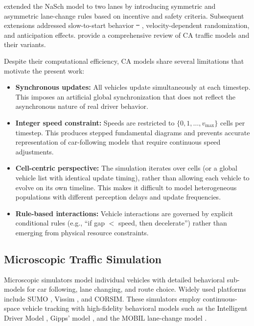 \documentclass[review,authoryear]{elsarticle}
\providecommand{\DIFaddtex}[1]{{\protect\color{blue}\uwave{#1}}} %
\providecommand{\DIFdeltex}[1]{{\protect\color{red}\sout{#1}}}                      %
\providecommand{\DIFaddbegin}{} %
\providecommand{\DIFaddend}{} %
\providecommand{\DIFdelbegin}{} %
\providecommand{\DIFdelend}{} %
\providecommand{\DIFadd}[1]{\texorpdfstring{\DIFaddtex{#1}}{#1}} %
\providecommand{\DIFdel}[1]{\texorpdfstring{\DIFdeltex{#1}}{}} %
\newcommand{\DIFscaledelfig}{0.5}
\newlength{\DIFdelgraphicswidth} %
\newlength{\DIFdelgraphicsheight} %
\newcommand{\DIFaddincludegraphics}[2][]{{\color{blue}\fbox{\DIFOincludegraphics[#1]{#2}}}} %
\newcommand{\DIFdelincludegraphics}[2][]{%
\sbox{\DIFdelgraphicsbox}{\DIFOincludegraphics[#1]{#2}}%
\settoboxwidth{\DIFdelgraphicswidth}{\DIFdelgraphicsbox} %
\settoboxtotalheight{\DIFdelgraphicsheight}{\DIFdelgraphicsbox} %
\scalebox{\DIFscaledelfig}{%
\parbox[b]{\DIFdelgraphicswidth}{\usebox{\DIFdelgraphicsbox}\\[-\baselineskip] \rule{\DIFdelgraphicswidth}{0em}}\llap{\resizebox{\DIFdelgraphicswidth}{\DIFdelgraphicsheight}{%
\setlength{\unitlength}{\DIFdelgraphicswidth}%
\begin{picture}(1,1)%
\thicklines\linethickness{2pt} %
{\color[rgb]{1,0,0}\put(0,0){\framebox(1,1){}}}%
{\color[rgb]{1,0,0}\put(0,0){\line( 1,1){1}}}%
{\color[rgb]{1,0,0}\put(0,1){\line(1,-1){1}}}%
\end{picture}%
}\hspace*{3pt}}} %
} %
\DeclareRobustCommand{\DIFaddbegin}{\DIFOaddbegin \let\includegraphics\DIFaddincludegraphics} %
\DeclareRobustCommand{\DIFaddend}{\DIFOaddend \let\includegraphics\DIFOincludegraphics} %
\DeclareRobustCommand{\DIFdelbegin}{\DIFOdelbegin \let\includegraphics\DIFdelincludegraphics} %
\DeclareRobustCommand{\DIFdelend}{\DIFOaddend \let\includegraphics\DIFOincludegraphics} %
\begin{document}
\citet{rickert1996two} extended the NaSch model to two lanes by introducing symmetric and asymmetric lane-change rules based on incentive and safety criteria. Subsequent extensions addressed slow-to-start behavior \DIFdelbegin \DIFdel{\mbox{%
\citep{knospe2004towards}}\hskip0pt%
}\DIFdelend \DIFaddbegin \DIFadd{\mbox{%
\citep{knospe2000towards}}\hskip0pt%
}\DIFaddend , velocity-dependent randomization, and anticipation effects. \citet{maerivoet2005cellular} provide a comprehensive review of CA traffic models and their variants.

Despite their computational efficiency, CA models share several limitations that motivate the present work:

\begin{itemize}
    \item \textbf{Synchronous updates:} All vehicles update simultaneously at each timestep. This imposes an artificial global synchronization that does not reflect the asynchronous nature of real driver behavior.

    \item \textbf{Integer speed constraint:} Speeds are restricted to $\{0, 1, \ldots, v_{\max}\}$ cells per timestep. This produces stepped fundamental diagrams and prevents accurate representation of car-following models that require continuous speed adjustments.

    \item \textbf{Cell-centric perspective:} The simulation iterates over cells (or a global vehicle list with identical update timing), rather than allowing each vehicle to evolve on its own timeline. This makes it difficult to model heterogeneous populations with different perception delays and update frequencies.

    \item \textbf{Rule-based interactions:} Vehicle interactions are governed by explicit conditional rules (e.g., ``if gap $<$ speed, then decelerate'') rather than emerging from physical resource constraints.
\end{itemize}

\subsection{Microscopic Traffic Simulation}
\label{sec:lit_microsim}

Microscopic simulators model individual vehicles with detailed behavioral sub-models for car following, lane changing, and route choice. Widely used platforms include SUMO \citep{lopez2018microscopic}, Vissim \citep{fellendorf2010microscopic}, and CORSIM. These simulators employ continuous-space vehicle tracking with high-fidelity behavioral models such as the Intelligent Driver Model \citep[IDM;][]{treiber2000congested}, Gipps' model \citep{gipps1981behavioural}, and the MOBIL lane-change model \citep{kesting2007general}.
\end{document}

